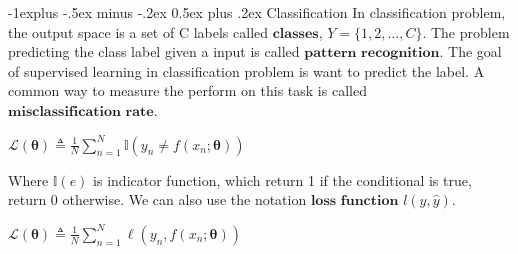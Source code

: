 \documentclass[10pt,landscape]{article}
\makeatletter
\renewcommand{\subsection}{\@startsection{subsection}{2}{0mm}%
                                {-1explus -.5ex minus -.2ex}%
                                {0.5ex plus .2ex}%
                                {\normalfont\normalsize\bfseries}}
\makeatother
\begin{document}
\begin{multicols*}{3}
\subsection{Classification}
    In classification problem, the output space is a set of C labels called $\textbf{classes}$, $Y = \{1,2,...,C\}$. The problem predicting the class label given a input is called $\textbf{pattern recognition}$.
    The goal of supervised learning in classification problem is want to predict the label. A common way to measure the perform on this task is called $\textbf{misclassification rate}$.
    \begin{center}
        $\mathcal{L}(\boldsymbol{\theta}) \triangleq \frac{1}{N} \sum_{n=1}^{N} \mathbb{I}\left(y_n \neq f(x_n; \boldsymbol{\theta})\right)$
    \end{center}
    Where $\mathbb{I}(e)$ is indicator function, which return 1 if the conditional is true, return 0 otherwise.
    We can also use the notation $\textbf{loss function}$ $l(y,\hat{y})$.
    \begin{center}
        $\mathcal{L}(\boldsymbol{\theta}) \triangleq \frac{1}{N} \sum_{n=1}^{N} \ell\left(y_n,  f(x_n; \boldsymbol{\theta})\right)$
    \end{center}

\end{multicols*}
\end{document}
